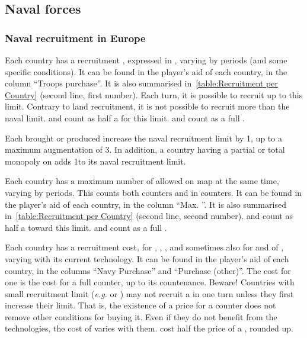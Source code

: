 \subsection{Naval forces}\label{chLogistic:Naval Purchase}
\subsubsection{Naval recruitment in Europe}
\aparag[Limit]
\bparag Each country has a recruitment , expressed in \ND,
varying by periods (and some specific conditions).
\bparag It can be found in the player's aid of each country, in the column
``Troops purchase''.
\bparag It is also summarised in~\ref{table:Recruitment per Country} (second
line, first number).
\bparag Each turn, it is possible to recruit up to this limit. Contrary to
land recruitment, it is not possible to recruit more than the naval
limit.
\bparag \NGD and \NDE count as half a \ND for this limit. \NTD and \VGD count
as a full \ND.

\label{chLogistic:Effect of Wood Purchase}
\label{chLogistic:Effect of Fish Monopoly Purchase}
\bparag Each  brought or produced increase the naval recruitment
limit by 1\ND, up to a maximum augmentation of 3\ND.
\bparag In addition, a country having a partial or total monopoly on
 adds 1\ND to its naval recruitment limit.

\bparag Each country has a maximum number of \ND allowed on map at the same
time, varying by periods. This counts both \ND counters and \ND in \FLEET
counters.
\bparag It can be found in the player's aid of each country, in the column
``Max. \ND''.
\bparag It is also summarised in~\ref{table:Recruitment per Country} (second
line, second number).
\bparag \NGD and \NDE count as half a \ND toward this limit. \NTD and \VGD
count as a full \ND.

\aparag[Costs]
\bparag Each country has a recruitment cost, for \NWD, \NTD, \FLEET\Facemoins,
and sometimes also for \NGD and \FLEET\Facemoins of \NGD, varying with its
current technology.
\bparag It can be found in the player's aid of each country, in the columns
``Navy Purchase'' and ``Purchase (other)''.
\bparag The cost for one \FLEET\Facemoins is the cost for a full counter, up
to its countenance.
\bparag Beware! Countries with small recruitment limit (\emph{e.g.} \POL or
\RUS) may not recruit a \FLEET\Facemoins in one turn unless they first
increase their limit. That is, the existence of a price for a counter does not
remove other conditions for buying it.
\bparag Even if they do not benefit from the technologies, the cost of \NGD
varies with them.
\bparag \NDE cost half the price of a \ND, rounded up.

